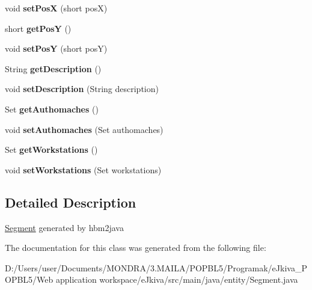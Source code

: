 \begin{DoxyCompactItemize}
void {\bfseries set\+PosX} (short posX)
\item 
\mbox{\label{classentity_1_1_segment_a49e9f7232f10a5d429f82782a96be138}} 
short {\bfseries get\+PosY} ()
\item 
\mbox{\label{classentity_1_1_segment_a6ce06e8e4f24903d09ae2c73505035d0}} 
void {\bfseries set\+PosY} (short posY)
\item 
\mbox{\label{classentity_1_1_segment_a8ac2a6c8d6e1948962c6dd6090c0fe36}} 
String {\bfseries get\+Description} ()
\item 
\mbox{\label{classentity_1_1_segment_a7bea5d3fe2bc567b8f1b66c352a60b1c}} 
void {\bfseries set\+Description} (String description)
\item 
\mbox{\label{classentity_1_1_segment_a292b54976ba0f33d4e044cc19c11392a}} 
Set {\bfseries get\+Authomaches} ()
\item 
\mbox{\label{classentity_1_1_segment_a28268832dcb0948d5cbbba6a442fb883}} 
void {\bfseries set\+Authomaches} (Set authomaches)
\item 
\mbox{\label{classentity_1_1_segment_a428afaed05b1f5e1234de6fecc446759}} 
Set {\bfseries get\+Workstations} ()
\item 
\mbox{\label{classentity_1_1_segment_a2f5476f699a728f71efd890d6d9e1ef0}} 
void {\bfseries set\+Workstations} (Set workstations)
\end{DoxyCompactItemize}


\subsection{Detailed Description}
\mbox{\hyperlink{classentity_1_1_segment}{Segment}} generated by hbm2java 

The documentation for this class was generated from the following file\+:\begin{DoxyCompactItemize}
\item 
D\+:/\+Users/user/\+Documents/\+M\+O\+N\+D\+R\+A/3.\+M\+A\+I\+L\+A/\+P\+O\+P\+B\+L5/\+Programak/e\+Jkiva\+\_\+\+P\+O\+P\+B\+L5/\+Web application workspace/e\+Jkiva/src/main/java/entity/Segment.\+java\end{DoxyCompactItemize}
